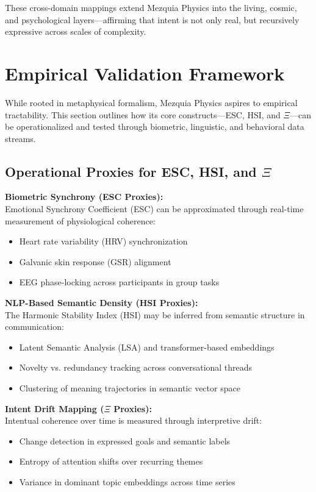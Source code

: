 \documentclass[12pt]{article}
\begin{document}
These cross-domain mappings extend Mezquia Physics into the living, cosmic, and psychological layers—affirming that intent is not only real, but recursively expressive across scales of complexity.

\section{Empirical Validation Framework}

While rooted in metaphysical formalism, Mezquia Physics aspires to empirical tractability. This section outlines how its core constructs—ESC, HSI, and \(\Xi\)—can be operationalized and tested through biometric, linguistic, and behavioral data streams.

\subsection{Operational Proxies for ESC, HSI, and \(\Xi\)}

\textbf{Biometric Synchrony (ESC Proxies):} \\
Emotional Synchrony Coefficient (ESC) can be approximated through real-time measurement of physiological coherence:
\begin{itemize}
  \item Heart rate variability (HRV) synchronization
  \item Galvanic skin response (GSR) alignment
  \item EEG phase-locking across participants in group tasks
\end{itemize}

\textbf{NLP-Based Semantic Density (HSI Proxies):} \\
The Harmonic Stability Index (HSI) may be inferred from semantic structure in communication:
\begin{itemize}
  \item Latent Semantic Analysis (LSA) and transformer-based embeddings
  \item Novelty vs. redundancy tracking across conversational threads
  \item Clustering of meaning trajectories in semantic vector space
\end{itemize}

\textbf{Intent Drift Mapping (\(\Xi\) Proxies):} \\
Intentual coherence over time is measured through interpretive drift:
\begin{itemize}
  \item Change detection in expressed goals and semantic labels
  \item Entropy of attention shifts over recurring themes
  \item Variance in dominant topic embeddings across time series
\end{itemize}
\end{document}
